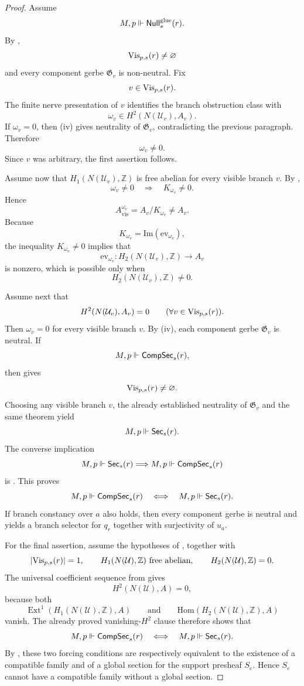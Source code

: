 \begin{proof}
Assume
\[
M,p\Vdash \mathsf{Null}^{\mathrm{glue}}_s(r).
\]
By ,
\[
\mathrm{Vis}_{p,s}(r)\neq\varnothing
\]
and every component gerbe $\mathfrak G_v$ is non-neutral. Fix
\[
v\in \mathrm{Vis}_{p,s}(r).
\]
The finite nerve presentation of $v$ identifies the branch obstruction class with
\[
\omega_v\in H^2(N(\mathcal U_v),A_v).
\]
If $\omega_v=0$, then (iv) gives neutrality of $\mathfrak G_v$, contradicting the previous paragraph. Therefore
\[
\omega_v\neq 0.
\]
Since $v$ was arbitrary, the first assertion follows.

Assume now that $H_1(N(\mathcal U_v),\mathbb Z)$ is free abelian for every visible branch $v$. By ,
\[
\omega_v\neq 0
\quad\Longrightarrow\quad
K_{\omega_v}\neq 0.
\]
Hence
\[
A_{\mathrm{vis}}^{\omega_v}=A_v/K_{\omega_v}\neq A_v.
\]
Because
\[
K_{\omega_v}=\mathrm{Im}(\mathrm{ev}_{\omega_v}),
\]
the inequality $K_{\omega_v}\neq 0$ implies that
\[
\mathrm{ev}_{\omega_v}:H_2(N(\mathcal U_v),\mathbb Z)\to A_v
\]
is nonzero, which is possible only when
\[
H_2(N(\mathcal U_v),\mathbb Z)\neq 0.
\]

Assume next that
\[
H^2(N(\mathcal U_v),A_v)=0
\qquad
(\forall v\in \mathrm{Vis}_{p,s}(r)).
\]
Then $\omega_v=0$ for every visible branch $v$. By (iv), each component gerbe $\mathfrak G_v$ is neutral. If
\[
M,p\Vdash \mathsf{CompSec}_s(r),
\]
then  gives
\[
\mathrm{Vis}_{p,s}(r)\neq\varnothing.
\]
Choosing any visible branch $v$, the already established neutrality of $\mathfrak G_v$ and the same theorem yield
\[
M,p\Vdash \mathsf{Sec}_s(r).
\]
The converse implication
\[
M,p\Vdash \mathsf{Sec}_s(r)\Longrightarrow M,p\Vdash \mathsf{CompSec}_s(r)
\]
is . This proves
\[
M,p\Vdash \mathsf{CompSec}_s(r)
\quad\Longleftrightarrow\quad
M,p\Vdash \mathsf{Sec}_s(r).
\]
If branch constancy over $a$ also holds, then every component gerbe is neutral and  yields a branch selector for $q_r$ together with surjectivity of $u_a$.

For the final assertion, assume the hypotheses of , together with
\[
|\mathrm{Vis}_{p,s}(r)|=1,
\qquad
H_1(N(\mathcal U),\mathbb Z)\ \text{free abelian},
\qquad
H_2(N(\mathcal U),\mathbb Z)=0.
\]
The universal coefficient sequence from  gives
\[
H^2(N(\mathcal U),A)=0,
\]
because both
\[
\operatorname{Ext}^1(H_1(N(\mathcal U),\mathbb Z),A)
\qquad\text{and}\qquad
\mathrm{Hom}(H_2(N(\mathcal U),\mathbb Z),A)
\]
vanish. The already proved vanishing-$H^2$ clause therefore shows that
\[
M,p\Vdash \mathsf{CompSec}_s(r)
\quad\Longleftrightarrow\quad
M,p\Vdash \mathsf{Sec}_s(r).
\]
By , these two forcing conditions are respectively equivalent to the existence of a compatible family and of a global section for the support presheaf $S_e$. Hence $S_e$ cannot have a compatible family without a global section.


\end{proof}
